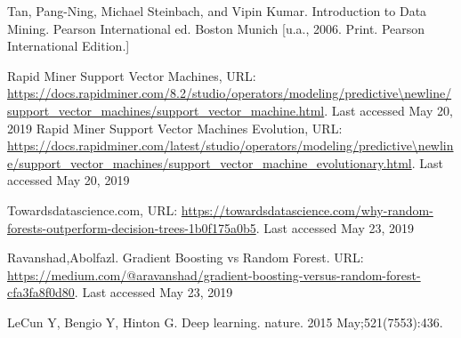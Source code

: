 \documentclass[runningheads]{llncs}
\begin{document}
\begin{thebibliography}{8}
Tan, Pang-Ning, Michael Steinbach, and Vipin Kumar. Introduction to Data Mining. Pearson International ed. Boston Munich [u.a., 2006. Print. Pearson International Edition.]

Rapid Miner Support Vector Machines, URL: \url{https://docs.rapidminer.com/8.2/studio/operators/modeling/predictive\newline/support\_vector\_machines/support\_vector\_machine.html}. Last accessed May 20, 2019
%
Rapid Miner Support Vector Machines Evolution, URL: \url{https://docs.rapidminer.com/latest/studio/operators/modeling/predictive\newline/support\_vector\_machines/support\_vector\_machine\_evolutionary.html}. Last accessed May 20, 2019

Towardsdatascience.com, URL: \url{https://towardsdatascience.com/why-random-forests-outperform-decision-trees-1b0f175a0b5}. Last accessed May 23, 2019

Ravanshad,Abolfazl. Gradient Boosting vs Random Forest. URL: \url{https://medium.com/@aravanshad/gradient-boosting-versus-random-forest-cfa3fa8f0d80}. Last accessed May 23, 2019

LeCun Y, Bengio Y, Hinton G. Deep learning. nature. 2015 May;521(7553):436.

\end{thebibliography}
\end{document}
